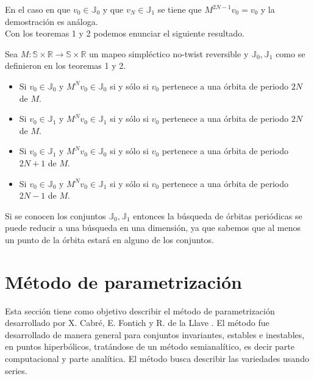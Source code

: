 En el caso en que $v_{0}\in \mathbb{J}_{0}$ y que $v_{N}\in\mathbb{J}_{1}$ se tiene que $M^{2N-1}v_{0}=v_{0}$ y la demostraci\'on es an\'aloga. \\

Con los teoremas 1 y 2 podemos enunciar el siguiente resultado.

\begin{corola}
		Sea $M:\mathbb{S} \times \mathbb{R} \longrightarrow \mathbb{S}\times\mathbb{R}$ un mapeo simpl\'ectico no-twist reversible y $\mathbb{J}_{0}, \mathbb{J}_{1}$ como se definieron en los teoremas 1 y 2. 
		\begin{itemize}
			\item Si $v_{0}\in \mathbb{J}_{0}$ y $M^{N}v_{0}\in \mathbb{J}_{0}$ si y s\'olo si $v_{0}$ pertenece a una \'orbita de periodo $2N$ de $M$.
			\item Si $v_{0}\in \mathbb{J}_{1}$ y $M^{N}v_{0}\in \mathbb{J}_{1}$ si y s\'olo si $v_{0}$ pertenece a una \'orbita de periodo $2N$ de $M$.
			\item Si $v_{0}\in \mathbb{J}_{1}$ y $M^{N}v_{0}\in \mathbb{J}_{0}$ si y s\'olo si $v_{0}$ pertenece a una \'orbita de periodo $2N+1$ de $M$.
			\item Si $v_{0}\in \mathbb{J}_{0}$ y $M^{N}v_{0}\in \mathbb{J}_{1}$ si y s\'olo si $v_{0}$ pertenece a una \'orbita de periodo $2N-1$ de $M$.
		\end{itemize}
\end{corola}
Si se conocen los conjuntos $\mathbb{J}_{0}, \mathbb{J}_{1}$ entonces la b\'usqueda de \'orbitas peri\'odicas se puede reducir a una b\'usqueda en una dimensi\'on, ya que sabemos que al menos un punto de la \'orbita estar\'a en alguno de los conjuntos.









\section{Método de parametrización}
 Esta sección tiene como objetivo describir el método de parametrización desarrollado por X. Cabré, E. Fontich y R. de la Llave \cite{Haro}. El método fue desarrollado de manera general para conjuntos invariantes, estables e inestables, en puntos hiperbólicos, tratándose de un método semianalítico, es decir parte computacional y parte analítica. El m\'etodo busca describir las variedades usando series.\\
	
